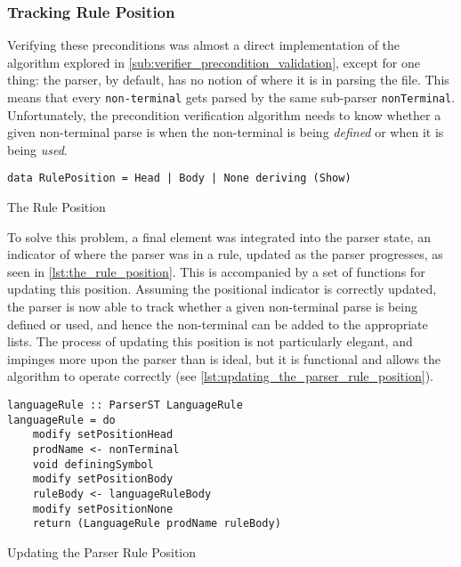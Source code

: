 \subsubsection{Tracking Rule Position} %
\label{ssub:tracking_rule_position}
Verifying these preconditions was almost a direct implementation of the algorithm explored in \autoref{sub:verifier_precondition_validation}, except for one thing: the parser, by default, has no notion of where it is in parsing the file.
This means that every \texttt{non-terminal} gets parsed by the same sub-parser \texttt{nonTerminal}. 
Unfortunately, the precondition verification algorithm needs to know whether a given non-terminal parse is when the non-terminal is being \textit{defined} or when it is being \textit{used}. 

\begin{listing}[!htb]
\begin{verbatim}
data RulePosition = Head | Body | None deriving (Show)
\end{verbatim}
\caption{The Rule Position}
\label{lst:the_rule_position}
\end{listing}

To solve this problem, a final element was integrated into the parser state, an indicator of where the parser was in a rule, updated as the parser progresses, as seen in \autoref{lst:the_rule_position}.
This is accompanied by a set of functions for updating this position.
Assuming the positional indicator is correctly updated, the parser is now able to track whether a given non-terminal parse is being defined or used, and hence the non-terminal can be added to the appropriate lists.
The process of updating this position is not particularly elegant, and impinges more upon the parser than is ideal, but it is functional and allows the algorithm to operate correctly (see \autoref{lst:updating_the_parser_rule_position}).

\begin{listing}[!htb]
\begin{verbatim}
languageRule :: ParserST LanguageRule
languageRule = do
    modify setPositionHead
    prodName <- nonTerminal
    void definingSymbol
    modify setPositionBody
    ruleBody <- languageRuleBody
    modify setPositionNone
    return (LanguageRule prodName ruleBody)
\end{verbatim}
\caption{Updating the Parser Rule Position}
\label{lst:updating_the_parser_rule_position}
\end{listing}

